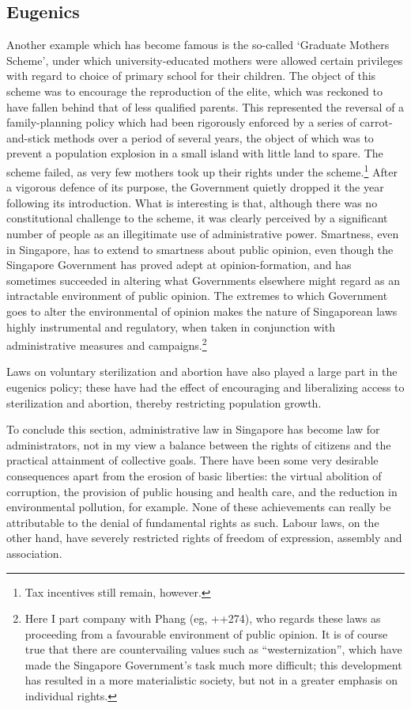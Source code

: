 \subsection{Eugenics}
Another example which has become famous is the so-called
`Graduate Mothers Scheme', under which university-educated
mothers were allowed certain privileges with regard to choice of
primary school for their children. The object of this scheme was
to encourage the reproduction of the elite, which was reckoned to
have fallen behind that of less qualified parents. This
represented the reversal of a family-planning policy which had
been rigorously enforced by a series of carrot-and-stick methods
over a period of several years, the object of which was to
prevent a population explosion in a small island with little land
to spare. The scheme failed, as very few mothers took up their
rights under the scheme.\footnote{ Tax incentives still remain,
  however.} After a vigorous defence of its purpose, the
Government quietly dropped it the year following its
introduction.  What is interesting is that, although there was no
constitutional challenge to the scheme, it was clearly perceived
by a significant number of people as an illegitimate use of
administrative power. Smartness, even in Singapore, has to extend
to smartness about public opinion, even though the Singapore
Government has proved adept at opinion-formation, and has
sometimes succeeded in altering what Governments elsewhere might
regard as an intractable environment of public opinion. The
extremes to which Government goes to alter the environmental of
opinion makes the nature of Singaporean laws highly instrumental
and regulatory, when taken in conjunction with administrative
measures and campaigns.\footnote{ Here I part company with Phang
  (eg, ++{{274}}), who regards
  these laws as proceeding from a favourable environment of
  public opinion. It is of course true that there are
  countervailing values such as ``westernization'', which have
  made the Singapore Government's task much more difficult; this
  development has resulted in a more materialistic society, but
  not in a greater emphasis on individual rights.}


Laws on voluntary sterilization and abortion have also played a
large part in the eugenics policy; these have had the effect of
encouraging and liberalizing access to sterilization and
abortion, thereby restricting population growth.

To conclude this section, administrative law in Singapore has
become law for administrators, not in my view a balance between
the rights of citizens and the practical attainment of collective
goals. There have been some very desirable consequences apart
from the erosion of basic liberties: the virtual abolition of
corruption, the provision of public housing and health care, and
the reduction in environmental pollution, for example. None of
these achievements can really be attributable to the denial of
fundamental rights as such. Labour laws, on the other hand, have
severely restricted rights of freedom of expression, assembly and
association.

